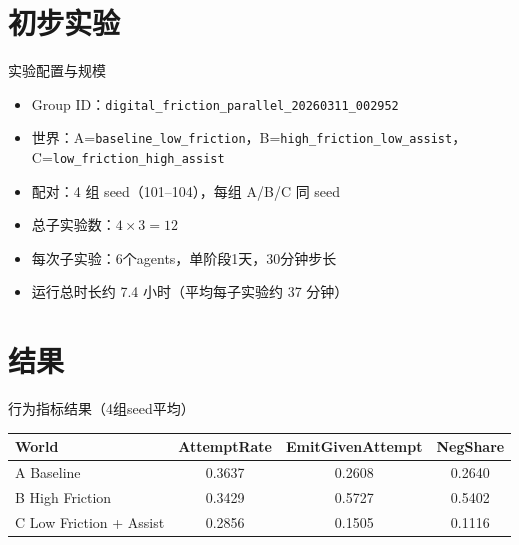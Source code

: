 \documentclass[aspectratio=169]{beamer}
\begin{document}
\section{初步实验}

\begin{frame}{实验配置与规模}
    \begin{itemize}
        \item Group ID：\texttt{digital\_friction\_parallel\_20260311\_002952}
        \item 世界：A=\texttt{baseline\_low\_friction}，B=\texttt{high\_friction\_low\_assist}，C=\texttt{low\_friction\_high\_assist}
        \item 配对：4 组 seed（101--104），每组 A/B/C 同 seed
        \item 总子实验数：\(4\times 3=12\)
        \item 每次子实验：6个agents，单阶段1天，30分钟步长
        \item 运行总时长约 7.4 小时（平均每子实验约 37 分钟）
    \end{itemize}
\end{frame}


\section{结果}

\begin{frame}{行为指标结果（4组seed平均）}
    \begin{center}
        \small
        \begin{tabular}{lccc}
            \toprule
            World & AttemptRate & EmitGivenAttempt & NegShare \\
            \midrule
            A Baseline & 0.3637 & 0.2608 & 0.2640 \\
            B High Friction & 0.3429 & 0.5727 & 0.5402 \\
            C Low Friction + Assist & 0.2856 & 0.1505 & 0.1116 \\
            \bottomrule
        \end{tabular}
    \end{center}
    \vspace{0.2cm}

\end{frame}
\end{document}
